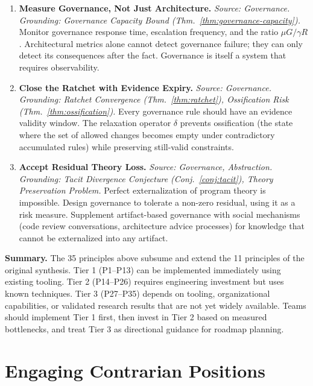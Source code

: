 \documentclass[11pt, a4paper, logo, copyright]{googledeepmind}
\begin{document}
\begin{enumerate}[label=\textbf{P\arabic*.}, leftmargin=3em, resume]
\item \textbf{Measure Governance, Not Just Architecture.}
\emph{Source: Governance. Grounding: Governance Capacity Bound (Thm.~\ref{thm:governance-capacity}).}
Monitor governance response time, escalation frequency, and the ratio $\mu G / \gamma R$. Architectural metrics alone cannot detect governance failure; they can only detect its consequences after the fact. Governance is itself a system that requires observability.

\item \textbf{Close the Ratchet with Evidence Expiry.}
\emph{Source: Governance. Grounding: Ratchet Convergence (Thm.~\ref{thm:ratchet}), Ossification Risk (Thm.~\ref{thm:ossification}).}
Every governance rule should have an evidence validity window. The relaxation operator $\delta$ prevents ossification (the state where the set of allowed changes becomes empty under contradictory accumulated rules) while preserving still-valid constraints.

\item \textbf{Accept Residual Theory Loss.}
\emph{Source: Governance, Abstraction. Grounding: Tacit Divergence Conjecture (Conj.~\ref{conj:tacit}), Theory Preservation Problem.}
Perfect externalization of program theory is impossible. Design governance to tolerate a non-zero residual, using it as a risk measure. Supplement artifact-based governance with social mechanisms (code review conversations, architecture advice processes) for knowledge that cannot be externalized into any artifact.

\end{enumerate}

\medskip
\noindent\textbf{Summary.} The 35 principles above subsume and extend the 11 principles of the original synthesis. Tier 1 (P1--P13) can be implemented immediately using existing tooling. Tier 2 (P14--P26) requires engineering investment but uses known techniques. Tier 3 (P27--P35) depends on tooling, organizational capabilities, or validated research results that are not yet widely available. Teams should implement Tier 1 first, then invest in Tier 2 based on measured bottlenecks, and treat Tier 3 as directional guidance for roadmap planning.
\section{Engaging Contrarian Positions}
\label{sec:contrarian}
\end{document}
